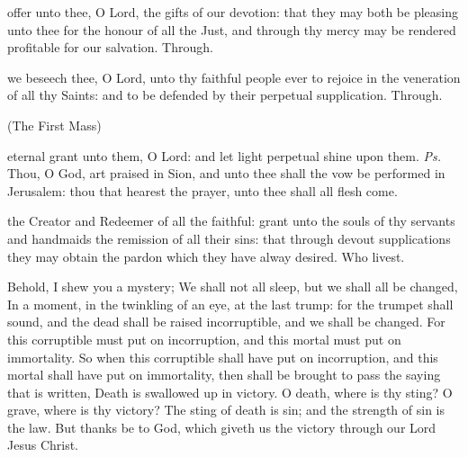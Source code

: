 
\secret\label{AllHallowsSecret}
 offer unto thee, O Lord, the gifts of our devotion: that they may both be pleasing unto thee for the honour of all the Just, and through thy mercy may be rendered profitable for our salvation. Through.


\postcommunion\label{AllHallowsPostcommunion}
 we beseech thee, O Lord, unto thy faithful people ever to rejoice in the veneration of all thy Saints: and to be defended by their perpetual supplication. Through.



\label{AllSouls}

\centerline{\small{(The First Mass)}}

\introit
{} eternal grant unto them, O Lord: and let light perpetual shine upon them. \textit{Ps.} Thou, O God, art praised in Sion, and unto thee shall the vow be performed in Jerusalem: thou that hearest the prayer, unto thee shall all flesh come.

\collect
{} the Creator and Redeemer of all the faithful: grant unto the souls of thy servants and handmaids the remission of all their sins: that through devout supplications they may obtain the pardon which they have alway desired. Who livest.

 Behold, I shew you a mystery; We shall not all sleep, but we shall all be changed, In a moment, in the twinkling of an eye, at the last trump: for the trumpet shall sound, and the dead shall be raised incorruptible, and we shall be changed. For this corruptible must put on incorruption, and this mortal must put on immortality. So when this corruptible shall have put on incorruption, and this mortal shall have put on immortality, then shall be brought to pass the saying that is written, Death is swallowed up in victory. O death, where is thy sting? O grave, where is thy victory? The sting of death is sin; and the strength of sin is the law. But thanks be to God, which giveth us the victory through our Lord Jesus Christ.

